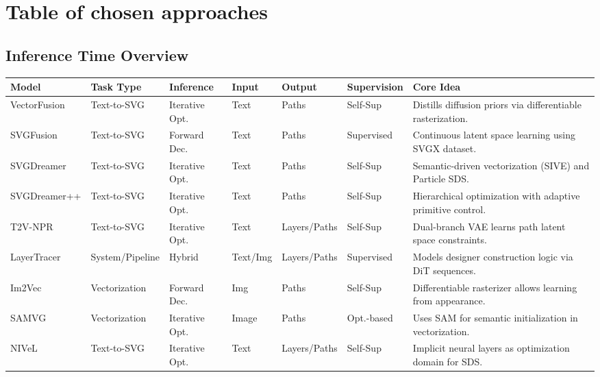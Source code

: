     \chapter{Table of chosen approaches}
    
    \begin{landscape}
    \thispagestyle{empty} %
    \centering
    \null\vfill %
    \small
    \section*{Inference Time Overview} %
    \begin{tabularx}{\linewidth}{l | l | l | l | l | l | X}
        \toprule
        \textbf{Model} & \textbf{Task Type} & \textbf{Inference} & \textbf{Input} & \textbf{Output} & \textbf{Supervision} & \textbf{Core Idea} \\
        \midrule
        VectorFusion & Text-to-SVG & Iterative Opt. & Text & Paths & Self-Sup & Distills diffusion priors via differentiable rasterization. \\ \hline
        SVGFusion & Text-to-SVG & Forward Dec. & Text & Paths & Supervised & Continuous latent space learning using SVGX dataset. \\ \hline
        SVGDreamer & Text-to-SVG & Iterative Opt. & Text & Paths & Self-Sup & Semantic-driven vectorization (SIVE) and Particle SDS. \\ \hline
        SVGDreamer++ & Text-to-SVG & Iterative Opt. & Text & Paths & Self-Sup & Hierarchical optimization with adaptive primitive control. \\ \hline
        T2V-NPR & Text-to-SVG & Iterative Opt. & Text & Layers/Paths & Self-Sup & Dual-branch VAE learns path latent space constraints. \\ \hline
        LayerTracer & System/Pipeline & Hybrid & Text/Img & Layers/Paths & Supervised & Models designer construction logic via DiT sequences. \\ \hline
        Im2Vec & Vectorization & Forward Dec. & Img & Paths & Self-Sup & Differentiable rasterizer allows learning from appearance. \\ \hline
        SAMVG & Vectorization & Iterative Opt. & Image & Paths & Opt.-based & Uses SAM for semantic initialization in vectorization. \\ \hline
        NIVeL & Text-to-SVG & Iterative Opt. & Text & Layers/Paths & Self-Sup & Implicit neural layers as optimization domain for SDS. \\ \hline

\end{tabularx}
\end{landscape}
